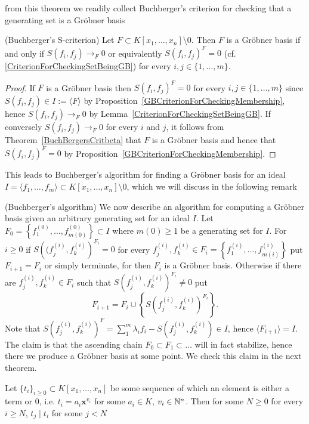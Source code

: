 from this theorem we readily collect Buchberger's criterion for checking that a generating set is a Gröbner basis
\begin{corollary}\label{BuchbergersCriterion}(Buchberger's S-criterion)
    Let $F\subset K[x_1,\dots,x_n]\setminus 0$. Then $F$ is a Gröbner basis if and only if $S(f_i,f_j)\to_F 0$ or equivalently $S(f_i,f_j)^F=0$ (cf. \ref{CriterionForCheckingSetBeingGB}) for every $i,j\in\{1,\dots,m\}$.
\end{corollary}
\begin{proof}
    If $F$ is a Gröbner basis then $S(f_i,f_j)^F=0$ for every $i,j\in\{1,\dots,m\}$ since $S(f_i,f_j)\in I:=\langle F\rangle$ by Proposition~\ref{GBCriterionForCheckingMembership}, hence $S(f_i,f_j)\to_F 0$ by Lemma~\ref{CriterionForCheckingSetBeingGB}. If conversely $S(f_i,f_j)\to_F 0$ for every $i$ and $j$, it follows from Theorem~\ref{BuchBergersCritbeta} that $F$ is a Gröbner basis and hence that $S(f_i,f_j)^F = 0$ by Proposition~\ref{GBCriterionForCheckingMembership}.  
\end{proof}
This leads to Buchberger's algorithm for finding a Gröbner basis for an ideal $I=\langle f_1,\dots,f_m\rangle\subset K[x_1,\dots,x_n]\setminus 0$, which we will discuss in the following remark
\begin{remark}(Buchberger's algorithm)
    We now describe an algorithm for computing a Gröbner basis given an arbitrary generating set for an ideal $I$. Let $F_0 = \left\{f_1^{(0)},\dots,f_{m(0)}^{(0)}\right\}\subset I$ where $m(0)\geq 1$ be a generating set for $I$. For $i\geq 0$ if $S\left((f_j^{(i)},f_k^{(i)}\right)^{F_i} =0$ for every $f_j^{(i)},f_k^{(i)}\in F_i=\left\{f_1^{(i)},\dots,f_{m(i)}^{(i)}\right\}$ put $F_{i+1} = F_i$ or simply terminate, for then $F_i$ is a Gröbner basis. Otherwise if there are $f_j^{(i)},f_k^{(i)}\in F_i$ such that $S\left(f_j^{(i)},f_k^{(i)}\right)^{F_i}\neq 0$ put $$F_{i+1} = F_i\cup\left\{S\left(f_j^{(i)},f_k^{(i)}\right)^{F_i}\right\}.$$ 
    Note that $S\left(f_j^{(i)},f_k^{(i)}\right)^F = \sum_1^m \lambda_if_i-S\left(f_j^{(i)},f_k^{(i)}\right)\in I$, hence $\langle F_{i+1}\rangle = I$. The claim is that the ascending chain $F_0\subset F_1 \subset \dots$ will in fact stabilize, hence there we produce a Gröbner basis at some point. We check this claim in the next theorem.   
\end{remark}
\begin{lemma}
    Let $\{t_i\}_{i\geq 0} \subset K[x_1,\dots,x_n]$ be some sequence of which an element is either a term or $0$, i.e. $t_i = a_i\mathbf{x}^{v_i}$ for some $a_i\in K$, $v_i\in \mathbb{N}^n$. Then for some $N\geq 0$ for every $i\geq N$, $t_j\mid t_i$ for some $j< N$ 
\end{lemma}

